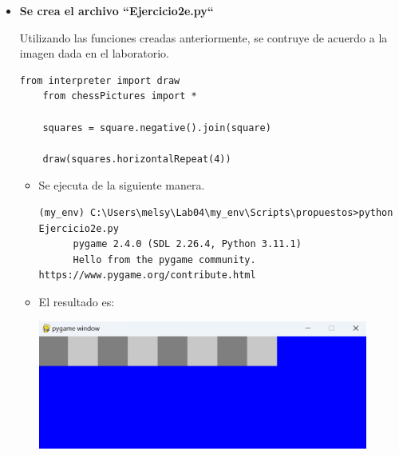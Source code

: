 \documentclass{article}
\begin{document}
\begin{itemize}
  \pagebreak

  \item \textbf{Se crea el archivo ``Ejercicio2e.py``}
  
  \vspace{\baselineskip}

  Utilizando las funciones creadas anteriormente, se contruye de acuerdo a la imagen dada en el laboratorio.

    \begin{lstlisting}[style=python]
    from interpreter import draw
    from chessPictures import *

    squares = square.negative().join(square)

    draw(squares.horizontalRepeat(4))
    \end{lstlisting}

    \vspace{\baselineskip}

    \begin{itemize}
      \item Se ejecuta de la siguiente manera.

      \begin{lstlisting}[style=shell]
      (my_env) C:\Users\melsy\Lab04\my_env\Scripts\propuestos>python Ejercicio2e.py
      pygame 2.4.0 (SDL 2.26.4, Python 3.11.1)
      Hello from the pygame community. https://www.pygame.org/contribute.html
      \end{lstlisting}

      \vspace{2\baselineskip}

      \item El resultado es:
      
      \vspace{\baselineskip}

      \begin{minipage}{\linewidth}
        \centering
        \includegraphics[width=0.9\textwidth]{imagenes/p_ej2e.png}
      \end{minipage}
    \end{itemize}


\end{itemize}
\end{document}
